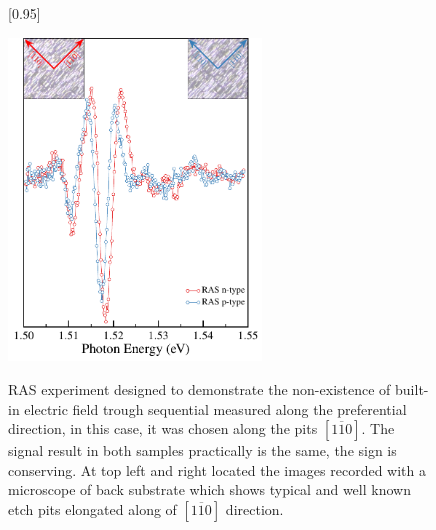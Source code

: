 \begin{figure}
	[0.95\FBwidth]
	{ \caption{RAS experiment designed to demonstrate the non-existence of built-in electric field trough sequential measured along the preferential direction, in this case, it was chosen  along the pits $[1\overline{1}0]$\cite{weyher2010defect}. The signal result in both samples practically is the same, the sign is conserving. At top left and right located the images recorded with a microscope of back substrate which shows typical and well known etch pits elongated \cite{yonenaga1993dislocations}
	along of $[1\overline{1}0]$ direction. 
	}\label{fig:chapter-3-subsec-ras-orientation}}
	{
	\includegraphics[width=0.6\textwidth]{../figures/chapter-3/ras-plots/out/ras-set-5.pdf}
	}
\end{figure}

